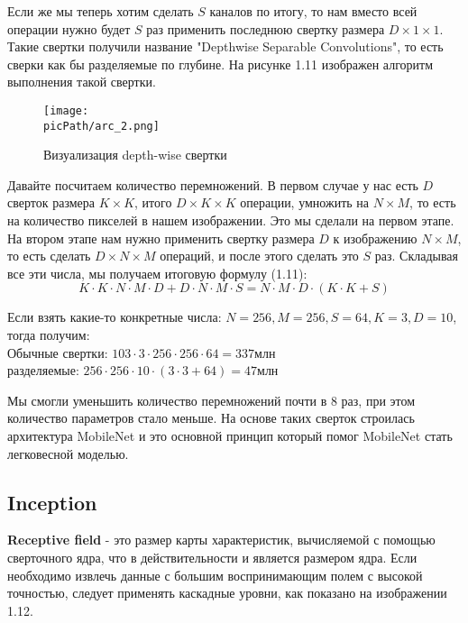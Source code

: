\documentclass[oneside,final,12pt]{extreport}
\newcommand{\picPath}{images}
\begin{document}
Если же мы теперь хотим сделать $S$ каналов по итогу, то нам вместо всей операции нужно будет $S$ раз применить последнюю свертку размера $D  \times 1 \times 1$. Такие свертки получили название "Depthwise Separable Convolutions", то есть сверки как бы разделяемые по глубине. На рисунке 1.11 изображен алгоритм выполнения такой свертки.
\begin{figure}[H]
\begin{center}
  \texttt{[image: \\picPath/arc\_2.png]}
  \caption{Визуализация depth-wise свертки}
  \label{fig:arc_2}
  \end{center}
\end{figure}
Давайте посчитаем количество перемножений. В первом случае у нас есть $D$ сверток размера $K \times K$, итого  $D \times K \times K$ операции, умножить на $N \times M$, то есть на количество пикселей в нашем изображении. Это мы сделали на первом этапе. На втором этапе нам нужно применить свертку размера $D$ к изображению $N \times M$, то есть сделать $D \times N \times M$ операций, и после этого сделать это $S$ раз. Складывая все эти числа, мы получаем итоговую формулу (1.11):
\begin{equation}
K\cdot K\cdot N\cdot M\cdot D + D\cdot N\cdot M\cdot S = N\cdot M\cdot D\cdot (K\cdot K + S)    
\end{equation}

Если взять какие-то конкретные числа:
$N=256, M=256, S=64, K=3, D=10$, тогда получим:\\
Обычные свертки:  $103\cdot 3\cdot 256\cdot 256\cdot 64 = 337$млн\\
разделяемые: $256\cdot 256\cdot 10\cdot (3\cdot 3 + 64)  = 47$млн

Мы смогли уменьшить количество перемножений почти в 8 раз, при этом количество параметров стало меньше. На основе таких сверток строилась архитектура MobileNet и это основной принцип который помог MobileNet стать легковесной моделью.

\subsection{Inception}
\textbf{Receptive field} - это размер карты характеристик, вычисляемой с помощью сверточного ядра, что в действительности и является размером ядра. Если необходимо извлечь данные с большим воспринимающим полем с высокой точностью, следует применять каскадные уровни, как показано на изображении 1.12. 
\end{document}
